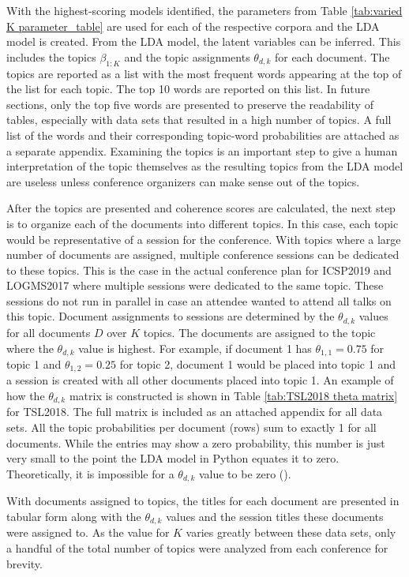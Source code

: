 \documentclass[a4paper, 12pt, twoside]{article}
\numberwithin{equation}{section} %
\begin{document}
With the highest-scoring models identified, the parameters from Table \ref{tab:varied K parameter_table} are used for each of the respective corpora and the LDA model is created. From the LDA model, the latent variables can be inferred. This includes the topics $\beta_{1:K}$ and the topic assignments $\theta_{d,k}$ for each document. The topics are reported as a list with the most frequent words appearing at the top of the list for each topic. The top 10 words are reported on this list. In future sections, only the top five words are presented to preserve the readability of tables, especially with data sets that resulted in a high number of topics. A full list of the words and their corresponding topic-word probabilities are attached as a separate appendix. Examining the topics is an important step to give a human interpretation of the topic themselves as the resulting topics from the LDA model are useless unless conference organizers can make sense out of the topics. 

After the topics are presented and coherence scores are calculated, the next step is to organize each of the documents into different topics. In this case, each topic would be representative of a session for the conference. With topics where a large number of documents are assigned, multiple conference sessions can be dedicated to these topics. This is the case in the actual conference plan for ICSP2019 and LOGMS2017 where multiple sessions were dedicated to the same topic. These sessions do not run in parallel in case an attendee wanted to attend all talks on this topic. Document assignments to sessions are determined by the $\theta_{d,k}$ values for all documents $D$ over $K$ topics. The documents are assigned to the topic where the $\theta_{d,k}$ value is highest. For example, if document 1 has $\theta_{1,1} = 0.75$ for topic 1 and $\theta_{1,2} = 0.25$ for topic 2, document 1 would be placed into topic 1 and a session is created with all other documents placed into topic 1. An example of how the $\theta_{d,k}$ matrix is constructed is shown in Table \ref{tab:TSL2018 theta matrix} for TSL2018. The full matrix is included as an attached appendix for all data sets. All the topic probabilities per document (rows) sum to exactly 1 for all documents. While the entries may show a zero probability, this number is just very small to the point the LDA model in Python equates it to zero. Theoretically, it is impossible for a $\theta_{d,k}$ value to be zero (\cite{blei2003}). 

With documents assigned to topics, the titles for each document are presented in tabular form along with the $\theta_{d,k}$ values and the session titles these documents were assigned to. As the value for $K$ varies greatly between these data sets, only a handful of the total number of topics were analyzed from each conference for brevity.
\end{document}
